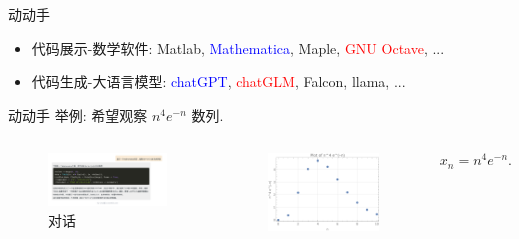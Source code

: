 \documentclass[
10pt, 
aspectratio=43, 
]{beamer}
\begin{document}
\begin{frame}{动动手}
	
	\begin{itemize}
		\item 代码展示-数学软件: Matlab, \textcolor{blue}{Mathematica}, Maple, \textcolor{red}{GNU Octave},  ...\\
		              
		\item 代码生成-大语言模型: \textcolor{blue}{chatGPT},  \textcolor{red}{chatGLM},  Falcon, llama,  ... 
	\end{itemize}
	
\end{frame}

\begin{frame}{动动手}
	举例: 希望观察 $n^4 e^{-n}$ 数列. 
	\begin{columns}
		\begin{figure}
			\centering
			\includegraphics[width=1.2\linewidth]{Chat酱-1696676606183.png}
			\caption{对话}
			
		\end{figure}
		\small
		\begin{figure}
			\centering
			\includegraphics[width=0.8\linewidth]{n^4 Exp[-n].png}
			        
		\end{figure}
		\begin{equation}
			x_n = n^4 e^{-n}.
		\end{equation}
	\end{columns}
\end{frame}
\end{document}
